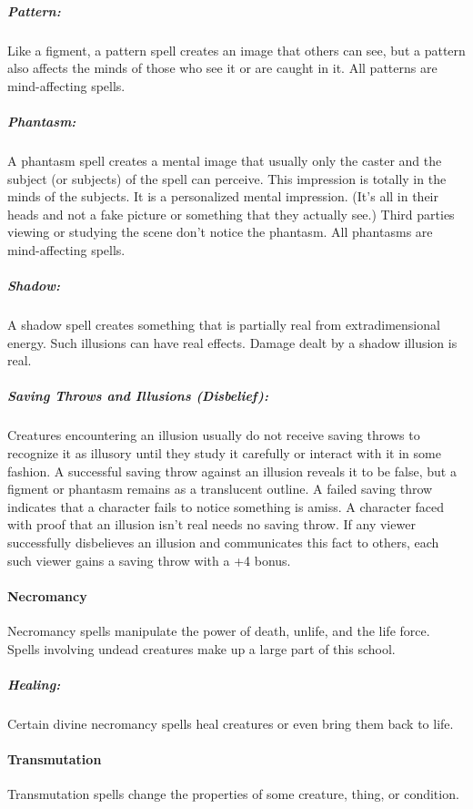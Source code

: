 \subparagraph{Pattern:}
Like a figment, a pattern spell creates an image that others can see, but a pattern also affects the minds of those who see it or are caught in it. 
All patterns are mind-affecting spells.

\subparagraph{Phantasm:}
A phantasm spell creates a mental image that usually only the caster and the subject (or subjects) of the spell can perceive. 
This impression is totally in the minds of the subjects. It is a personalized mental impression. 
(It's all in their heads and not a fake picture or something that they actually see.) 
Third parties viewing or studying the scene don't notice the phantasm. All phantasms are mind-affecting spells.

\subparagraph{Shadow:}
A shadow spell creates something that is partially real from extradimensional energy. 
Such illusions can have real effects. Damage dealt by a shadow illusion is real.

\subparagraph{Saving Throws and Illusions (Disbelief):}
Creatures encountering an illusion usually do not receive saving throws to recognize 
it as illusory until they study it carefully or interact with it in some fashion.
A successful saving throw against an illusion reveals it to be false, 
but a figment or phantasm remains as a translucent outline.
A failed saving throw indicates that a character fails to notice something is amiss. 
A character faced with proof that an illusion isn't real needs no saving throw. 
If any viewer successfully disbelieves an illusion and communicates this fact to others, 
each such viewer gains a saving throw with a +4 bonus.
\paragraph{Necromancy}
Necromancy spells manipulate the power of death, unlife, and the life force. 
Spells involving undead creatures make up a large part of this school.

\subparagraph{Healing:}
Certain divine necromancy spells heal creatures or even bring them back to life.
\paragraph{Transmutation}
Transmutation spells change the properties of some creature, thing, or condition.

